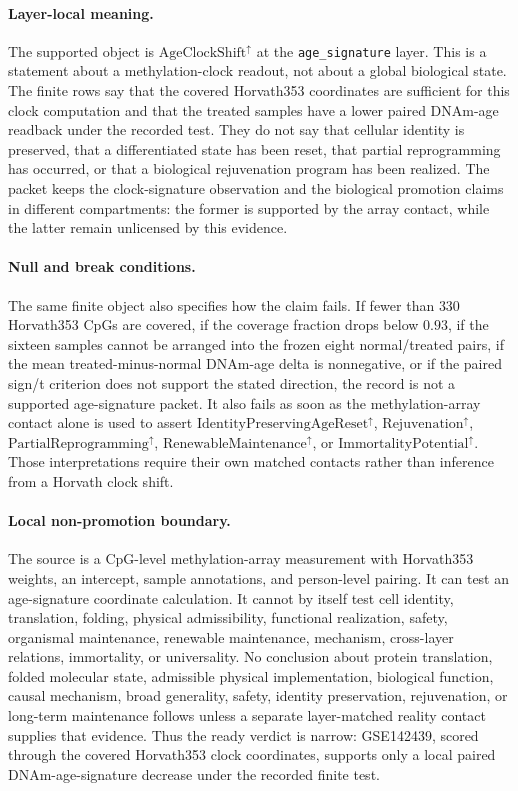 \paragraph{Layer-local meaning.}
The supported object is $\mathrm{AgeClockShift}^{\uparrow}$ at the \texttt{age\_signature} layer.  This is a statement about a methylation-clock readout, not about a global biological state.  The finite rows say that the covered Horvath353 coordinates are sufficient for this clock computation and that the treated samples have a lower paired DNAm-age readback under the recorded test.  They do not say that cellular identity is preserved, that a differentiated state has been reset, that partial reprogramming has occurred, or that a biological rejuvenation program has been realized.  The packet keeps the clock-signature observation and the biological promotion claims in different compartments: the former is supported by the array contact, while the latter remain unlicensed by this evidence.

\paragraph{Null and break conditions.}
The same finite object also specifies how the claim fails.  If fewer than $330$ Horvath353 CpGs are covered, if the coverage fraction drops below $0.93$, if the sixteen samples cannot be arranged into the frozen eight normal/treated pairs, if the mean treated-minus-normal DNAm-age delta is nonnegative, or if the paired sign/t criterion does not support the stated direction, the record is not a supported age-signature packet.  It also fails as soon as the methylation-array contact alone is used to assert $\mathrm{IdentityPreservingAgeReset}^{\uparrow}$, $\mathrm{Rejuvenation}^{\uparrow}$, $\mathrm{PartialReprogramming}^{\uparrow}$, $\mathrm{RenewableMaintenance}^{\uparrow}$, or $\mathrm{ImmortalityPotential}^{\uparrow}$.  Those interpretations require their own matched contacts rather than inference from a Horvath clock shift.

\paragraph{Local non-promotion boundary.}
The source is a CpG-level methylation-array measurement with Horvath353 weights, an intercept, sample annotations, and person-level pairing.  It can test an age-signature coordinate calculation.  It cannot by itself test cell identity, translation, folding, physical admissibility, functional realization, safety, organismal maintenance, renewable maintenance, mechanism, cross-layer relations, immortality, or universality.  No conclusion about protein translation, folded molecular state, admissible physical implementation, biological function, causal mechanism, broad generality, safety, identity preservation, rejuvenation, or long-term maintenance follows unless a separate layer-matched reality contact supplies that evidence.  Thus the ready verdict is narrow: GSE142439, scored through the covered Horvath353 clock coordinates, supports only a local paired DNAm-age-signature decrease under the recorded finite test.
